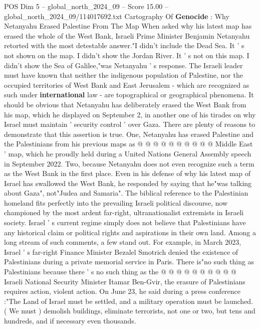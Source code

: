 \begin{textsample}{POS Dim 5 – global\_north\_2024\_09 – Score 15.00 – global\_north\_2024\_09/114017692.txt}  \label{ex:f5_pos_356}
Cartography Of \textbf{Genocide} : Why Netanyahu Erased Palestine From The Map When asked why his latest map has erased the whole of the West Bank, Israeli Prime Minister Benjamin Netanyahu retorted with the most detestable answer."I didn't include the Dead Sea.
It ' s not shown on the map.
I didn't show the Jordan River.
It ' s not on this map.
I didn't show the Sea of Galilee,"was Netanyahu ' s response.
The Israeli leader must have known that neither the indigenous population of Palestine, nor the occupied territories of West Bank and East Jerusalem - which are recognized as such under \textbf{international} law - are topographical or geographical phenomena.
It should be obvious that Netanyahu has deliberately erased the West Bank from his map, which he displayed on September 2, in another one of his tirades on why Israel must maintain ' security control ' over Gaza.
There are plenty of reasons to demonstrate that this assertion is true.
One, Netanyahu has erased Palestine and the Palestinians from his previous maps as @ @ @ @ @ @ @ @ @ @ Middle East ' map, which he proudly held during a United Nations General Assembly speech in September 2022.
Two, because Netanyahu does not even recognize such a term as the West Bank in the first place.
Even in his defense of why his latest map of Israel has swallowed the West Bank, he responded by saying that he"was talking about Gaza", not"Judea and Samaria".
The biblical reference to the Palestinian homeland fits perfectly into the prevailing Israeli political discourse, now championed by the most ardent far-right, ultranationalist extremists in Israeli society.
Israel ' s current regime simply does not believe that Palestinians have any historical claim or political rights and aspirations in their own land.
Among a long stream of such comments, a few stand out.
For example, in March 2023, Israel ' s far-right Finance Minister Bezalel Smotrich denied the existence of Palestinians during a private memorial service in Paris.
There is"no such thing as Palestinians because there ' s no such thing as the @ @ @ @ @ @ @ @ @ @ Israeli National Security Minister Itamar Ben-Gvir, the erasure of Palestinians requires action, violent action.
On June 23, he said during a press conference :"The Land of Israel must be settled, and a military operation must be launched. ( We must ) demolish buildings, eliminate terrorists, not one or two, but tens and hundreds, and if necessary even thousands.

\end{textsample}
